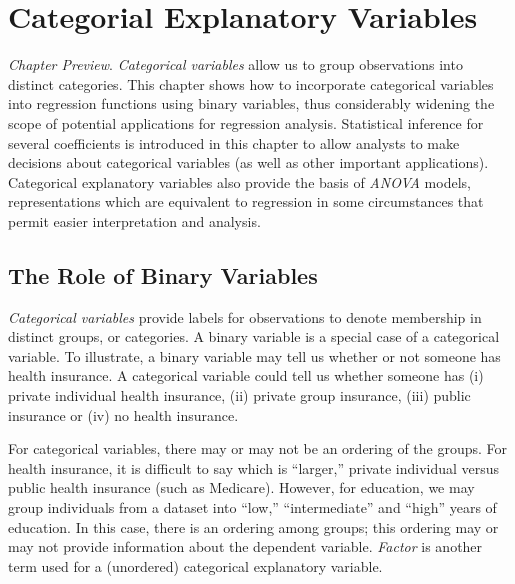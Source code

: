 \setcounter{chapter}{3}

\chapter{Categorial Explanatory Variables}


{\small \textit{Chapter Preview}. \textit{Categorical variables}
allow us to group observations into distinct categories. This
chapter shows how to incorporate categorical variables into
regression functions using binary variables, thus considerably
widening the scope of potential applications for regression
analysis. Statistical inference for several coefficients is
introduced in this chapter to allow analysts to make decisions about
categorical variables (as well as other important applications).
Categorical explanatory variables also provide the basis of
\textit{ANOVA} models, representations which are equivalent to
regression in some circumstances that permit easier interpretation
and analysis.}

\section{The Role of Binary Variables}

\textit{Categorical variables} provide labels for observations to
denote membership in distinct groups, or categories. A binary
variable is a special case of a categorical variable. To illustrate,
a binary variable may tell us whether or not someone has health
insurance. A categorical variable could tell us whether someone has
(i) private individual health insurance, (ii) private group
insurance, (iii) public insurance or (iv) no health insurance.

For categorical variables, there may or may not be an ordering of
the groups. For health insurance, it is difficult to say which is
``larger,'' private individual versus public health insurance (such
as Medicare). However, for education, we may group individuals from
a dataset into ``low,'' ``intermediate'' and ``high'' years of
education. In this case, there is an ordering among groups; this
ordering may or may not provide information about the dependent
variable. \textit{Factor} is another term used for a (unordered)
categorical explanatory variable.

